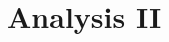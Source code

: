 \documentclass[
../../Mathe2Zusammenfassung2024.tex,
]
{subfiles}
\begin{document}
\section{Analysis II}
\end{document}
